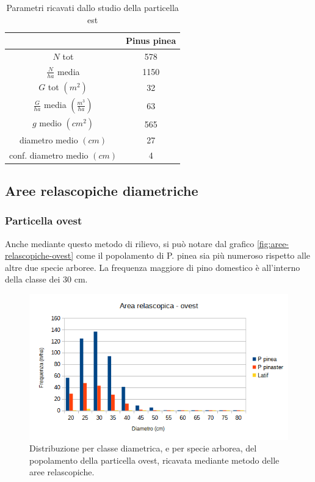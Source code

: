 \begin{table}[H]
  \caption{Parametri ricavati dallo studio della particella est}
    \centering
    \begin{tabular}{cc}
     \toprule
       & Pinus pinea  \\
       \midrule
        $N$ tot & 578\\
        $\frac{N}{ha}$ media & 1150 \\
         $G$ tot $(m^2)$ & 32 \\
        $\frac{G}{ha}$ media $(\frac{m^3}{ha})$ & 63 \\
        $g$ medio $(cm^2)$ & 565 \\
        diametro medio  $(cm)$ & 27 \\
        conf. diametro medio $(cm)$ & 4 \\
       \bottomrule
        \end{tabular}
    \label{tab:tab_areesaggio_est}
\end{table}

\subsection{Aree relascopiche diametriche}
\subsubsection*{Particella ovest}
Anche mediante questo metodo di rilievo, si può notare dal grafico \autoref{fig:aree-relascopiche-ovest} come il popolamento di P. pinea sia più numeroso rispetto alle altre due specie arboree. La frequenza maggiore di pino domestico è all'interno della classe dei 30 cm.\\
\begin{figure}[H]
    \centering
    \includegraphics[width=0.7 \textwidth]{immagini/aree-relascopiche-ovest.png}
    \caption{Distribuzione per classe diametrica, e per specie arborea, del popolamento della particella ovest, ricavata mediante metodo delle aree relascopiche.}
    \label{fig:aree-relascopiche-ovest}
\end{figure}

